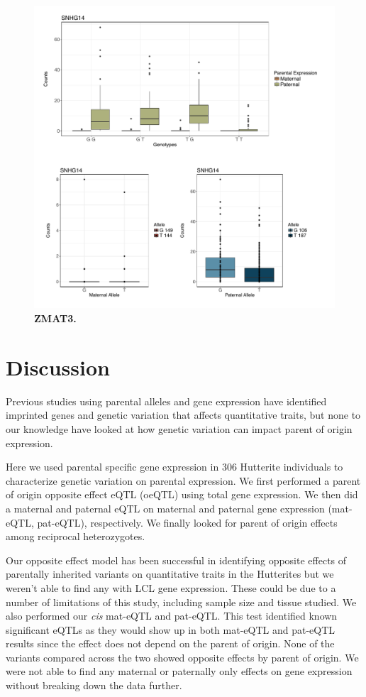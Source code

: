 \begin{figure}[!htb]
\centering \includegraphics[width=5in]{img/ch04/fig-13-ZMAT3.pdf}
\caption[ZMAT3.]{\textbf{ZMAT3.} }
\label{fig:ZMAT3}
\end{figure}



\section{Discussion}\label{ch04-discussion}

Previous studies using parental alleles and gene expression have identified imprinted genes and genetic variation that affects quantitative traits\cite{Zoledziewska:2015do,Baran:2015cx,Benonisdottir:2016dz,Garg2012a}, but none to our knowledge have looked at how genetic variation can impact parent of origin expression.

Here we used parental specific gene expression in 306 Hutterite individuals to characterize genetic variation on parental expression. We first performed a parent of origin opposite effect eQTL (oeQTL) using total gene expression. We then did a maternal and paternal eQTL on maternal and paternal gene expression (mat-eQTL, pat-eQTL), respectively. We finally looked for parent of origin effects among reciprocal heterozygotes.

Our opposite effect model has been successful in identifying opposite effects of parentally inherited variants on quantitative traits in the Hutterites but we weren't able to find any with LCL gene expression. These could be due to a number of limitations of this study, including sample size and tissue studied. We also performed our \emph{cis} mat-eQTL and pat-eQTL. This test identified known significant eQTLs as they would show up in both mat-eQTL and pat-eQTL results since the effect does not depend on the parent of origin. None of the variants compared across the two showed opposite effects by parent of origin. We were not able to find any maternal or paternally only effects on gene expression without breaking down the data further.

